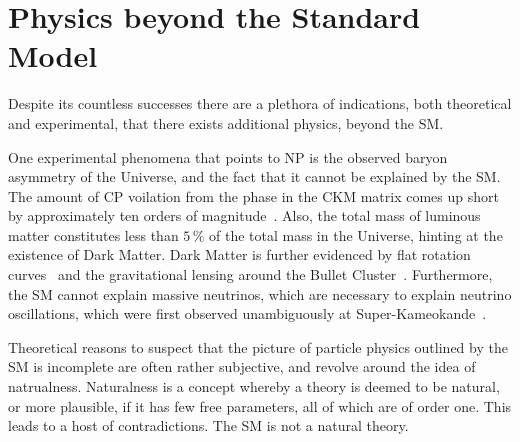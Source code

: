 \section{Physics beyond the Standard Model}

Despite its countless successes there are a plethora of indications, both theoretical and
experimental, that there exists additional physics, beyond the SM.

One experimental phenomena that points to NP is the observed baryon asymmetry of the Universe, and
the fact that it cannot be explained by the SM.
The amount of CP voilation from the phase in the CKM matrix comes up short by approximately ten
orders of magnitude~\cite{Cline:2006ts,Huet:1994jb}.
Also, the total mass of luminous matter constitutes less than $5\,\%$ of the
total mass in the Universe, hinting at the existence of Dark Matter.
Dark Matter is further evidenced by flat rotation
curves~\cite{1970ApJ...159..379R,1980ApJ...238..471R} and the gravitational lensing around the
Bullet Cluster~\cite{Markevitch:2003at}.
Furthermore, the SM cannot explain massive neutrinos, which are necessary to explain neutrino
oscillations, which were first observed unambiguously at
Super-Kameokande~\cite{PhysRevLett.81.1562}.

Theoretical reasons to suspect that the picture of particle physics outlined by the
SM is incomplete are often rather subjective, and revolve around the idea of natrualness.
Naturalness is a concept whereby a theory is deemed to be natural, or more plausible, if it has few
free parameters, all of which are of order one.
This leads to a host of contradictions.
The SM is not a natural theory.


